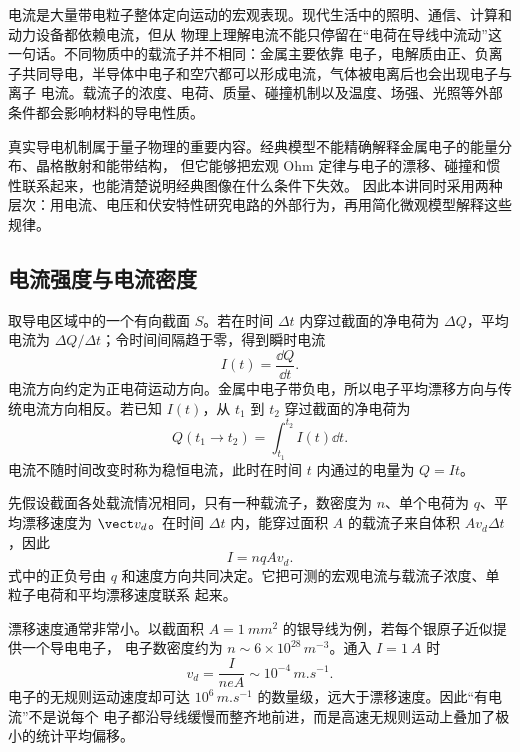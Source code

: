 电流是大量带电粒子整体定向运动的宏观表现。现代生活中的照明、通信、计算和动力设备都依赖电流，但从
物理上理解电流不能只停留在“电荷在导线中流动”这一句话。不同物质中的载流子并不相同：金属主要依靠
电子，电解质由正、负离子共同导电，半导体中电子和空穴都可以形成电流，气体被电离后也会出现电子与离子
电流。载流子的浓度、电荷、质量、碰撞机制以及温度、场强、光照等外部条件都会影响材料的导电性质。

真实导电机制属于量子物理的重要内容。经典模型不能精确解释金属电子的能量分布、晶格散射和能带结构，
但它能够把宏观 Ohm 定律与电子的漂移、碰撞和惯性联系起来，也能清楚说明经典图像在什么条件下失效。
因此本讲同时采用两种层次：用电流、电压和伏安特性研究电路的外部行为，再用简化微观模型解释这些规律。

\subsection*{电流强度与电流密度}

取导电区域中的一个有向截面 $S$。若在时间 $\Delta t$ 内穿过截面的净电荷为 $\Delta Q$，平均电流为
$\Delta Q/\Delta t$；令时间间隔趋于零，得到瞬时电流
\begin{equation}
  \boxed{I(t)=\frac{\dd Q}{\dd t}}.
\end{equation}
电流方向约定为正电荷运动方向。金属中电子带负电，所以电子平均漂移方向与传统电流方向相反。若已知
$I(t)$，从 $t_1$ 到 $t_2$ 穿过截面的净电荷为
\begin{equation}
  \boxed{Q(t_1\to t_2)=\int_{t_1}^{t_2}I(t)\dd t}.
\end{equation}
电流不随时间改变时称为稳恒电流，此时在时间 $t$ 内通过的电量为 $Q=It$。

先假设截面各处载流情况相同，只有一种载流子，数密度为 $n$、单个电荷为 $q$、平均漂移速度为
$\vect v_d$。在时间 $\Delta t$ 内，能穿过面积 $A$ 的载流子来自体积 $Av_d\Delta t$，因此
\begin{equation}
  \boxed{I=nqAv_d}.
\end{equation}
式中的正负号由 $q$ 和速度方向共同决定。它把可测的宏观电流与载流子浓度、单粒子电荷和平均漂移速度联系
起来。

漂移速度通常非常小。以截面积 $A=\SI{1}{mm^2}$ 的银导线为例，若每个银原子近似提供一个导电电子，
电子数密度约为 $n\sim6\times10^{28}\,\si{m^{-3}}$。通入 $I=\SI{1}{A}$ 时
\begin{equation}
  v_d=\frac{I}{neA}\sim10^{-4}\,\si{m.s^{-1}}.
\end{equation}
电子的无规则运动速度却可达 $10^6\,\si{m.s^{-1}}$ 的数量级，远大于漂移速度。因此“有电流”不是说每个
电子都沿导线缓慢而整齐地前进，而是高速无规则运动上叠加了极小的统计平均偏移。

